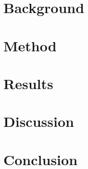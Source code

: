 \documentclass[a4paper, 12pt, notitlepage]{report}
\newif\ifrelease
\begin{document}
\chapter{Background}\label{ch:background}

\cleardoublepage

\chapter{Method}\label{ch:method}

\cleardoublepage

\chapter{Results}\label{ch:results}

\cleardoublepage

\chapter{Discussion}\label{ch:discussion}

\cleardoublepage

\chapter{Conclusion}\label{ch:conclusion}

\cleardoublepage






\ifrelease
\appendix

\chapter{Source code}\label{appendix:code}

\cleardoublepage

\chapter{Results}\label{appendix:results}

\cleardoublepage
\fi
\end{document}
